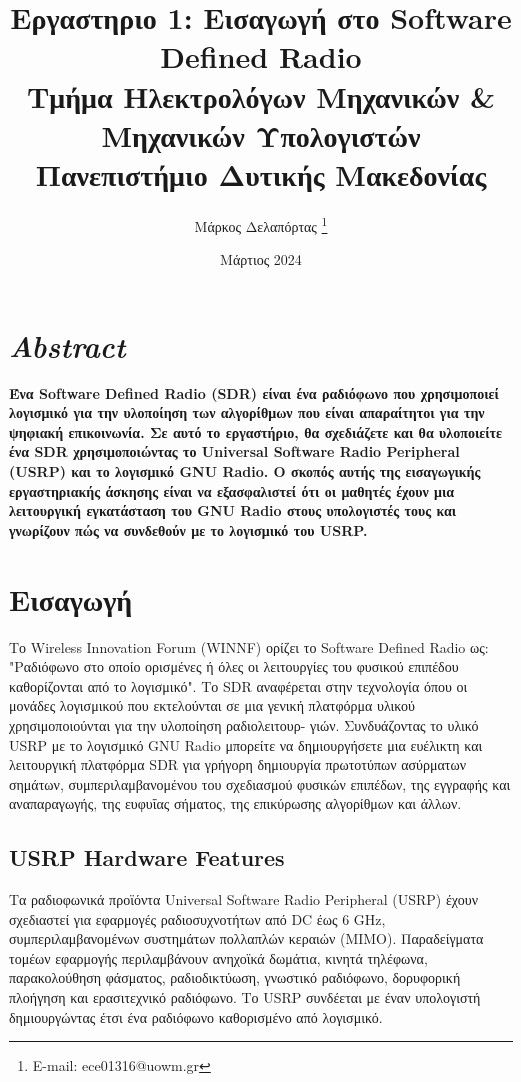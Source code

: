 \documentclass[12pt]{report}
\title{\textsf{Εργαστηριο 1: Εισαγωγή στο Software Defined Radio\\
    \large Τμήμα Ηλεκτρολόγων Μηχανικών \& Μηχανικών Υπολογιστών \\
    Πανεπιστήμιο Δυτικής Μακεδονίας
}}
\author{\textsf{Μάρκος Δελαπόρτας} \footnote{E-mail: ece01316@uowm.gr}}
\date{\textsf{Mάρτιος 2024}}
\begin{document}
    \maketitle

    \section*{\textsf{\textit{Abstract}}}\textbf{
        Ένα Software Defined Radio (SDR) είναι ένα ραδιόφωνο
        που χρησιμοποιεί λογισμικό για την υλοποίηση των αλγορίθμων που
        είναι απαραίτητοι για την ψηφιακή επικοινωνία.
        Σε αυτό το εργαστήριο, θα σχεδιάζετε και θα υλοποιείτε ένα SDR
        χρησιμοποιώντας το Universal Software Radio Peripheral (USRP)
        και το λογισμικό GNU Radio.
        Ο σκοπός αυτής της εισαγωγικής εργαστηριακής άσκησης είναι να
        εξασφαλιστεί ότι οι μαθητές έχουν μια λειτουργική εγκατάσταση του
        GNU Radio στους υπολογιστές τους και γνωρίζουν πώς να συνδεθούν
        με το λογισμικό του USRP.}

    \section{\textsf{Εισαγωγή}}
        Το Wireless Innovation Forum (WINNF) ορίζει το Software Defined Radio
        ως: "Ραδιόφωνο στο οποίο ορισμένες ή όλες οι λειτουργίες του φυσικού
        επιπέδου καθορίζονται από το λογισμικό". Το SDR αναφέρεται στην
        τεχνολογία όπου οι μονάδες λογισμικού που εκτελούνται σε μια γενική
        πλατφόρμα υλικού χρησιμοποιούνται για την υλοποίηση ραδιολειτουρ- γιών.
        Συνδυάζοντας το υλικό USRP με το λογισμικό GNU Radio μπορείτε να
        δημιουργήσετε μια ευέλικτη και λειτουργική πλατφόρμα SDR για γρήγορη
        δημιουργία πρωτοτύπων ασύρματων σημάτων, συμπεριλαμβανομένου του
        σχεδιασμού φυσικών επιπέδων, της εγγραφής και αναπαραγωγής, της
        ευφυΐας σήματος, της επικύρωσης αλγορίθμων και άλλων.

        \subsection{\textsf{USRP Hardware Features}}
            Τα ραδιοφωνικά προϊόντα Universal Software Radio Peripheral (USRP)
            έχουν σχεδιαστεί για εφαρμογές ραδιοσυχνοτήτων από DC έως 6 GHz,
            συμπεριλαμβανομένων συστημάτων πολλαπλών κεραιών (MIMO).
            Παραδείγματα τομέων εφαρμογής περιλαμβάνουν ανηχοϊκά δωμάτια, 
            κινητά τηλέφωνα, παρακολούθηση φάσματος, ραδιοδικτύωση, γνωστικό
            ραδιόφωνο, δορυφορική πλοήγηση και ερασιτεχνικό ραδιόφωνο. 
            Το USRP συνδέεται με έναν υπολογιστή δημιουργώντας έτσι ένα 
            ραδιόφωνο καθορισμένο από λογισμικό.
\end{document}
